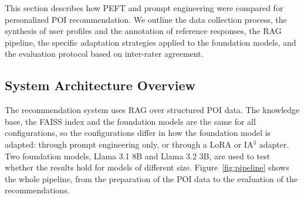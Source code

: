 \documentclass[journal,article,submit,pdftex,moreauthors]{Definitions/mdpi}
\begin{document}
This section describes how PEFT and prompt engineering were compared for personalized POI recommendation. We outline the data collection process, the synthesis of user profiles and the annotation of reference responses, the RAG pipeline, the specific adaptation strategies applied to the foundation models, and the evaluation protocol based on inter-rater agreement.

\subsection{System Architecture Overview}

The recommendation system uses RAG over structured POI data. The knowledge base, the FAISS index and the foundation models are the same for all configurations, so the configurations differ in how the foundation model is adapted: through prompt engineering only, or through a LoRA or IA$^3$ adapter. Two foundation models, Llama 3.1 8B and Llama 3.2 3B, are used to test whether the results hold for models of different size. Figure~\ref{fig:pipeline} shows the whole pipeline, from the preparation of the POI data to the evaluation of the recommendations.
\end{document}
